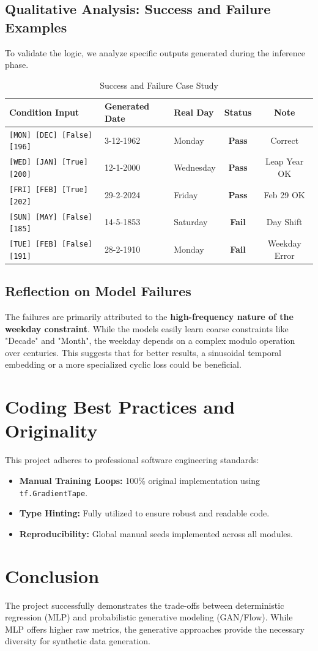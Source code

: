 \documentclass[12pt, a4paper]{article}
\begin{document}
\subsection{Qualitative Analysis: Success and Failure Examples}
To validate the logic, we analyze specific outputs generated during the inference phase.

\begin{table}[H]
    \centering
    \caption{Success and Failure Case Study}
    \begin{tabular}{lllcc}
        \toprule
        Condition Input & Generated Date & Real Day & Status & Note \\
        \midrule
        \texttt{[MON] [DEC] [False] [196]} & 3-12-1962 & Monday & \textbf{Pass} & Correct \\
        \texttt{[WED] [JAN] [True] [200]} & 12-1-2000 & Wednesday & \textbf{Pass} & Leap Year OK \\
        \texttt{[FRI] [FEB] [True] [202]} & 29-2-2024 & Friday & \textbf{Pass} & Feb 29 OK \\
        \texttt{[SUN] [MAY] [False] [185]} & 14-5-1853 & Saturday & \textbf{Fail} & Day Shift \\
        \texttt{[TUE] [FEB] [False] [191]} & 28-2-1910 & Monday & \textbf{Fail} & Weekday Error \\
        \bottomrule
    \end{tabular}
\end{table}

\subsection{Reflection on Model Failures}
The failures are primarily attributed to the \textbf{high-frequency nature of the weekday constraint}. While the models easily learn coarse constraints like "Decade" and "Month", the weekday depends on a complex modulo operation over centuries. This suggests that for better results, a sinusoidal temporal embedding or a more specialized cyclic loss could be beneficial.

\section{Coding Best Practices and Originality}
This project adheres to professional software engineering standards:
\begin{itemize}
    \item \textbf{Manual Training Loops:} 100\% original implementation using \texttt{tf.GradientTape}.
    \item \textbf{Type Hinting:} Fully utilized to ensure robust and readable code.
    \item \textbf{Reproducibility:} Global manual seeds implemented across all modules.
\end{itemize}

\section{Conclusion}
The project successfully demonstrates the trade-offs between deterministic regression (MLP) and probabilistic generative modeling (GAN/Flow). While MLP offers higher raw metrics, the generative approaches provide the necessary diversity for synthetic data generation.
\end{document}

